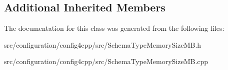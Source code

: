 \subsection*{Additional Inherited Members}


The documentation for this class was generated from the following files\-:\begin{DoxyCompactItemize}
\item 
src/configuration/config4cpp/src/Schema\-Type\-Memory\-Size\-M\-B.\-h\item 
src/configuration/config4cpp/src/Schema\-Type\-Memory\-Size\-M\-B.\-cpp\end{DoxyCompactItemize}
